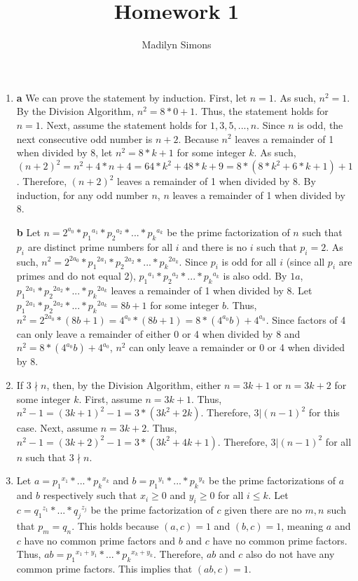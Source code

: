 \documentclass{article}
\title{Homework 1}
\author{Madilyn Simons}
\date{}
\begin{document}
\maketitle

\begin{enumerate}

\item \textbf{a} We can prove the statement by induction.  First, let $n = 1$.  As such, $n^2 = 1$.  By the Division Algorithm, $n^2 = 8*0 + 1$.  Thus, the statement holds for $n = 1$.  Next, assume the statement holds for $1, 3, 5, ..., n$.  Since $n$ is odd, the next consecutive odd number is $n+2$.  Because $n^2$ leaves a remainder of 1 when divided by 8, let $n^2 = 8*k + 1$ for some integer $k$.  As such, $(n+2)^2 = n^2 + 4*n + 4 = 64*k^2 + 48*k + 9 = 8 * (8*k^2 + 6*k + 1) + 1$.  Therefore, $(n+2)^2$ leaves a remainder of 1 when divided by 8.  By induction, for any odd number $n$, $n$ leaves a remainder of 1 when divided by 8.

\textbf{b} Let $n = 2^{a_0} * {p_1}^{a_1} * {p_2}^{a_2} * ... * {p_k}^{a_k}$ be the prime factorization of $n$ such that $p_i$ are distinct prime numbers for all $i$ and there is no $i$ such that $p_i = 2$.  As such, $n^2 = 2^{2a_0} * {p_1}^{2a_1} * {p_2}^{2a_2} * ... * {p_k}^{2a_k}$.  Since $p_i$ is odd for all $i$ (since all $p_i$ are primes and do not equal 2), ${p_1}^{a_1} * {p_2}^{a_2} * ... * {p_k}^{a_k}$ is also odd.  By $1a$, ${p_1}^{2a_1} * {p_2}^{2a_2} * ... * {p_k}^{2a_k}$ leaves a remainder of 1 when divided by 8.  Let ${p_1}^{2a_1} * {p_2}^{2a_2} * ... * {p_k}^{2a_k} = 8b + 1$ for some integer $b$.  Thus, $n^2 = 2^{2a_0} * (8b + 1) = 4^{a_0} * (8b + 1) = 8 * (4^{a_0}b) + 4^{a_0}.$  Since factors of 4 can only leave a remainder of either 0 or 4 when divided by 8 and $n^2 = 8 * (4^{a_0}b) + 4^{a_0}$, $n^2$ can only leave a remainder or 0 or 4 when divided by 8.

\item If $3 \nmid n$, then, by the Division Algorithm, either $n = 3k + 1$ or $n = 3k + 2$ for some integer $k$.  First, assume $n = 3k + 1$.  Thus, $n^2 - 1 = (3k + 1)^2 - 1 = 3 * (3k^2 + 2k)$.  Therefore, $3 \vert (n - 1)^2$ for this case.  Next, assume $n = 3k + 2$.  Thus, $n^2 - 1 = (3k + 2)^2 - 1 = 3 * (3k^2 + 4k + 1)$.  Therefore, $3 \vert (n - 1)^2$ for all $n$ such that $3 \nmid n$.

\item Let $a = {p_1}^{x_1} * ... * {p_k}^{x_k}$ and $b = {p_1}^{y_1} * ... * {p_k}^{y_k}$ be the prime factorizations of $a$ and $b$ respectively such that $x_i \geq 0$ and $y_i \geq 0$ for all $i \leq k$.  Let $c = {q_1}^{z_1} * ... * {q_j}^{z_j}$ be the prime factorization of $c$ given there are no $m, n$ such that $p_m = q_n$.  This holds because $(a, c) = 1$ and $(b, c) = 1$, meaning $a$ and $c$ have no common prime factors and $b$ and $c$ have no common prime factors.  Thus, $ab = {p_1}^{x_1 + y_1} * ... * {p_k}^{x_k + y_k}$.  Therefore, $ab$ and $c$ also do not have any common prime factors.  This implies that $(ab, c) = 1$.


\end{enumerate}
\end{document}
